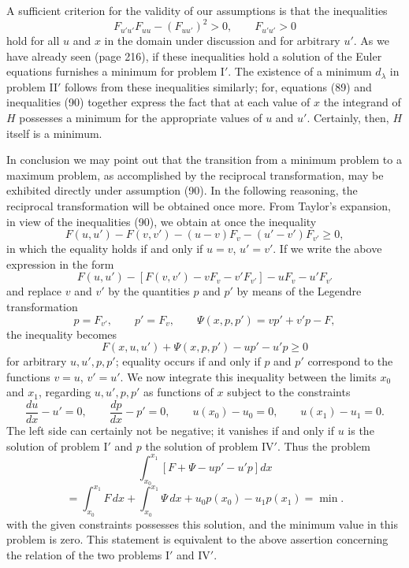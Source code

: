 A sufficient criterion for the validity of our assumptions is that the inequalities
\begin{equation}\tag{90}
F_{u'u'}F_{uu}-(F_{uu'})^2>0,\qquad F_{u'u'}>0
\end{equation}
hold for all $u$ and $x$ in the domain under discussion and for arbitrary $u'$. As we have already seen (page 216), if these inequalities hold a solution of the Euler equations furnishes a minimum for problem I$'$. The existence of a minimum $d_\lambda$ in problem II$'$ follows from these inequalities similarly; for, equations (89) and inequalities (90) together express the fact that at each value of $x$ the integrand of $H$ possesses a minimum for the appropriate values of $u$ and $u'$. Certainly, then, $H$ itself is a minimum.

In conclusion we may point out that the transition from a minimum problem to a maximum problem, as accomplished by the reciprocal transformation, may be exhibited directly under assumption (90). In the following reasoning, the reciprocal transformation will be obtained once more. From Taylor's expansion, in view of the inequalities (90), we obtain at once the inequality
\[
F(u,u')-F(v,v')-(u-v)F_v-(u'-v')F_{v'}\ge0,
\]
in which the equality holds if and only if $u=v$, $u'=v'$. If we write the above expression in the form
\[
F(u,u')-[F(v,v')-vF_v-v'F_{v'}]-uF_v-u'F_{v'}
\]
and replace $v$ and $v'$ by the quantities $p$ and $p'$ by means of the Legendre transformation
\[
p=F_{v'},\qquad p'=F_v,\qquad \Psi(x,p,p')=vp'+v'p-F,
\]
the inequality becomes
\[
F(x,u,u')+\Psi(x,p,p')-up'-u'p\ge0
\]
for arbitrary $u,u',p,p'$; equality occurs if and only if $p$ and $p'$ correspond to the functions $v=u$, $v'=u'$. We now integrate this inequality between the limits $x_0$ and $x_1$, regarding $u,u',p,p'$ as functions of $x$ subject to the constraints
\[
\frac{du}{dx}-u'=0,\qquad \frac{dp}{dx}-p'=0,\qquad
u(x_0)-u_0=0,\qquad u(x_1)-u_1=0.
\]
The left side can certainly not be negative; it vanishes if and only if $u$ is the solution of problem I$'$ and $p$ the solution of problem IV$'$. Thus the problem
\[
\int_{x_0}^{x_1}[F+\Psi-up'-u'p]dx
\]
\[
=\int_{x_0}^{x_1}F\,dx+\int_{x_0}^{x_1}\Psi\,dx+u_0p(x_0)-u_1p(x_1)=\min.
\]
with the given constraints possesses this solution, and the minimum value in this problem is zero. This statement is equivalent to the above assertion concerning the relation of the two problems I$'$ and IV$'$.

